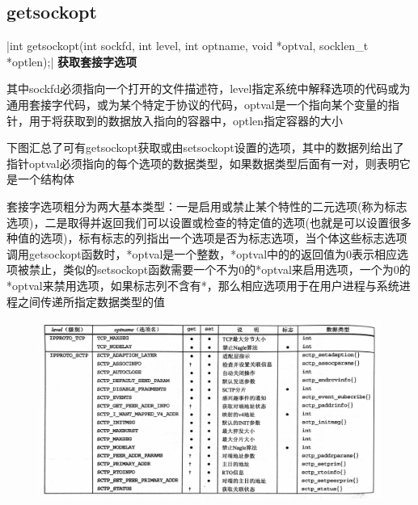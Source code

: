 \subsection{getsockopt}
|int getsockopt(int sockfd, int level, int optname, void *optval, socklen_t *optlen);|
\noindent \textbf{获取套接字选项}
\begin{spacing}{2.0}
其中sockfd必须指向一个打开的文件描述符，level指定系统中解释选项的代码或为通用套接字代码，或为某个特定于协议的代码，optval是一个指向某个变量的指针，用于将获取到的数据放入指向的容器中，optlen指定容器的大小

下图汇总了可有getsockopt获取或由setsockopt设置的选项，其中的数据列给出了指针optval必须指向的每个选项的数据类型，如果数据类型后面有一对{}，则表明它是一个结构体

套接字选项粗分为两大基本类型：一是启用或禁止某个特性的二元选项(称为标志选项)，二是取得并返回我们可以设置或检查的特定值的选项(也就是可以设置很多种值的选项)，标有标志的列指出一个选项是否为标志选项，当个体这些标志选项调用getsockopt函数时，*optval是一个整数，*optval中的的返回值为0表示相应选项被禁止，类似的setsockopt函数需要一个不为0的*optval来启用选项，一个为0的*optval来禁用选项，如果标志列不含有*，那么相应选项用于在用户进程与系统进程之间传递所指定数据类型的值
\begin{figure}[!htb]
\includegraphics[width=\textwidth]{Picture/getsockopt2}
\end{figure}
\newpage
\begin{figure}[!htb]

\end{figure}
\end{spacing}
